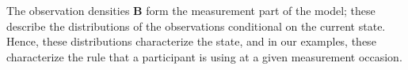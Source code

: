 \documentclass[a4paper,12pt,man]{apa} %
\newcommand{\citep}{\cite}
\newcommand{\citet}{\citeA}
\newcommand{\mat}{\mathbf}
\newcommand{\vc}{\mathbf}
\begin{document}
The observation densities $\mat{B}$ form the measurement part of the
model; these describe the distributions of the observations
conditional on the current state. Hence, these distributions
characterize the state, and in our examples, these characterize the
rule that a participant is using at a given measurement occasion.

% 
% 
% 
% 
\end{document}
